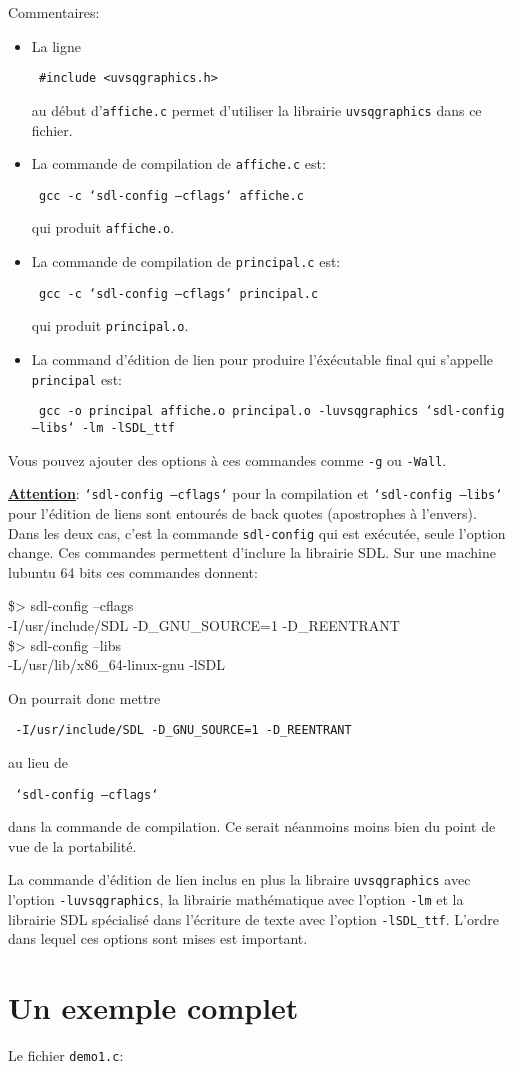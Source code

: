 \documentclass{report}
\newcommand\code[1]{
\begin{mdframed}[linecolor=purple,backgroundcolor=blue!10]
{\tt
#1
}
\end{mdframed}
}
\begin{document}
\vspace{5mm}
Commentaires:
\begin{itemize}
\item La ligne
	\code{\#include <uvsqgraphics.h>}
	au début d'\texttt{affiche.c} permet d'utiliser la librairie \texttt{uvsqgraphics} dans ce fichier.
\item La commande de compilation de \texttt{affiche.c} est:
	\code{gcc -c `sdl-config --cflags` affiche.c}
	qui produit \texttt{affiche.o}.
\item La commande de compilation de \texttt{principal.c} est:
	\code{gcc -c `sdl-config --cflags` principal.c}
	qui produit \texttt{principal.o}.
\item La command d'édition de lien pour produire l'éxécutable final qui s'appelle \texttt{principal} est:
	\code{gcc -o principal affiche.o principal.o -luvsqgraphics `sdl-config --libs` -lm -lSDL\_ttf}
\end{itemize}

Vous pouvez ajouter des options à ces commandes comme \texttt{-g} ou \texttt{-Wall}.

\vspace{5mm}
\noindent
\underline{\bf Attention}: \texttt{`sdl-config --cflags`} pour la compilation et \texttt{`sdl-config --libs`} pour l'édition de liens sont entourés de back quotes (apostrophes à l'envers).
Dans les deux cas, c'est la commande \texttt{sdl-config} qui est exécutée, seule l'option change. Ces commandes permettent d'inclure la librairie SDL.
Sur une machine lubuntu 64 bits ces commandes donnent:
\code{
\$> sdl-config --cflags\\
-I/usr/include/SDL -D\_GNU\_SOURCE=1 -D\_REENTRANT\\
\$> sdl-config --libs\\
-L/usr/lib/x86\_64-linux-gnu -lSDL
}
On pourrait donc mettre
\code{-I/usr/include/SDL -D\_GNU\_SOURCE=1 -D\_REENTRANT}
au lieu de
\code{`sdl-config --cflags`}
dans la commande de compilation. Ce serait néanmoins moins bien du point de vue de la portabilité.

\vspace{5mm}
La commande d'édition de lien inclus en plus la libraire \texttt{uvsqgraphics} avec l'option \texttt{-luvsqgraphics}, 
la librairie mathématique avec l'option \texttt{-lm} et la librairie SDL spécialisé dans l'écriture de texte avec l'option 
\texttt{-lSDL\_ttf}. L'ordre dans lequel ces options sont mises est important.



\chapter{Un exemple complet\label{chap:exemple}}
Le fichier \texttt{demo1.c}:
\code{

}
\end{document}
